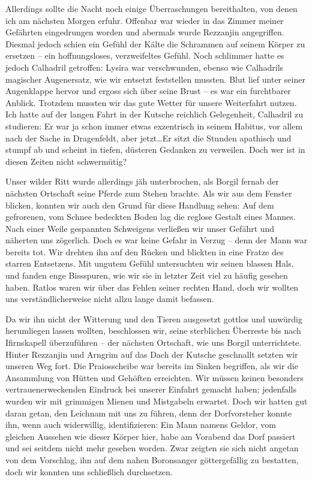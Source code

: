 Allerdings sollte die Nacht noch einige Überraschungen bereithalten, von denen ich am nächsten Morgen erfuhr. Offenbar war wieder in das Zimmer meiner Gefährten eingedrungen worden und abermals wurde Rezzanjin angegriffen. Diesmal jedoch schien ein Gefühl der Kälte die Schrammen auf seinem Körper zu ersetzen -- ein hoffnungsloses, verzweifeltes Gefühl. Noch schlimmer hatte es jedoch Calhadril getroffen: Lysira war verschwunden, ebenso wie Calhadrils magischer Augenersatz, wie wir entsetzt feststellen mussten. Blut lief unter seiner Augenklappe hervor und ergoss sich über seine Brust -- es war ein furchtbarer Anblick. Trotzdem mussten wir das gute Wetter für unsere Weiterfahrt nutzen. Ich hatte auf der langen Fahrt in der Kutsche reichlich Gelegenheit, Calhadril zu studieren: Er war ja schon immer etwas exzentrisch in seinem Habitus, vor allem nach der Sache in Dragenfeldt, aber jetzt\dots Er sitzt die Stunden apathisch und stumpf ab und scheint in tiefen, düsteren Gedanken zu verweilen. Doch wer ist in diesen Zeiten nicht schwermütig?


Unser wilder Ritt wurde allerdings jäh unterbrochen, als Borgil fernab der nächsten Ortschaft seine Pferde zum Stehen brachte. Als wir aus dem Fenster blicken, konnten wir auch den Grund für diese Handlung sehen: Auf dem gefrorenen, vom Schnee bedeckten Boden lag die reglose Gestalt eines Mannes. Nach einer Weile gespannten Schweigens verließen wir unser Gefährt und näherten uns zögerlich. Doch es war keine Gefahr in Verzug -- denn der Mann war bereits tot. Wir drehten ihn auf den Rücken und blickten in eine Fratze des starren Entsetzens. Mit ungutem Gefühl untersuchten wir seinen blassen Hals, und fanden enge Bissspuren, wie wir sie in letzter Zeit viel zu häufig gesehen haben. Ratlos waren wir über das Fehlen seiner rechten Hand, doch wir wollten uns verständlicherweise nicht allzu lange damit befassen. 


Da wir ihn nicht der Witterung und den Tieren ausgesetzt gottlos und unwürdig herumliegen lassen wollten, beschlossen wir, seine sterblichen Überreste bis nach Ifirnskapell überzuführen -- der nächsten Ortschaft, wie uns Borgil unterrichtete. Hinter Rezzanjin und Arngrim auf das Dach der Kutsche geschnallt setzten wir unseren Weg fort. Die Praiosscheibe war bereits im Sinken begriffen, als wir die Ansammlung von Hütten und Gehöften erreichten. Wir müssen keinen besonders vertrauenerweckenden Eindruck bei unserer Einfahrt gemacht haben; jedenfalls wurden wir mit grimmigen Mienen und Mistgabeln erwartet. Doch wir hatten gut daran getan, den Leichnam mit uns zu führen, denn der Dorfvorsteher konnte ihn, wenn auch widerwillig, identifizieren: Ein Mann namens Geldor, vom gleichen Aussehen wie dieser Körper hier, habe am Vorabend das Dorf passiert und sei seitdem nicht mehr gesehen worden. Zwar zeigten sie sich nicht angetan von dem Vorschlag, ihn auf dem nahen Boronsanger göttergefällig zu bestatten, doch wir konnten uns schließlich durchsetzen.


